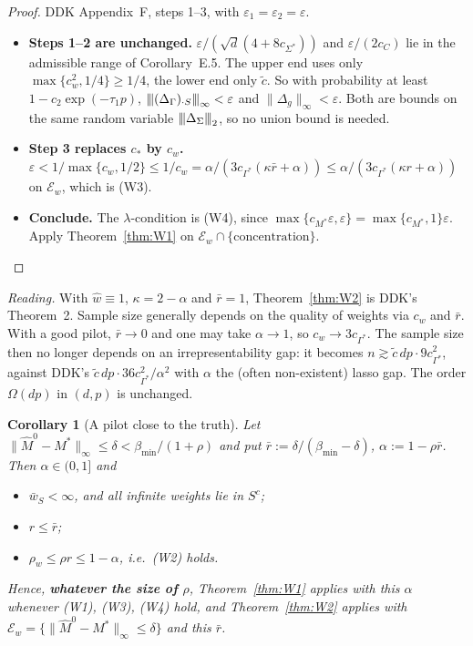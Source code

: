 \documentclass[11pt,a4paper]{article}
\numberwithin{equation}{section}
\theoremstyle{plain}
\newtheorem{corollary}[theorem]{Corollary}
\theoremstyle{remark}
\newcommand{\opnorm}[1]{{\vert\kern-0.25ex\vert\kern-0.25ex\vert #1 \vert\kern-0.25ex\vert\kern-0.25ex\vert}}
\begin{document}
\begin{proof}
DDK Appendix~F, steps 1--3, with $\varepsilon_1=\varepsilon_2=\varepsilon$.
\begin{itemize}
  \item \textbf{Steps 1--2 are unchanged.} $\varepsilon/(\sqrt d(4+8c_{\Sigma^*}))$ and $\varepsilon/(2c_C)$ lie in the admissible range of Corollary~E.5. The upper end uses only $\max\{c_w^2,1/4\}\ge1/4$, the lower end only $\tilde c$. So with probability at least $1-c_2\exp(-\tau_1p)$, $\opnorm{(\Delta_\Gamma)_{\cdot S}}_\infty<\varepsilon$ and $\|\Delta_g\|_\infty<\varepsilon$. Both are bounds on the same random variable $\opnorm{\Delta_\Sigma}_2$, so no union bound is needed.
  \item \textbf{Step 3 replaces $c_*$ by $c_w$.} $\varepsilon<1/\max\{c_w,1/2\}\le1/c_w=\alpha/(3c_{\Gamma^*}(\kappa\bar r+\alpha))\le\alpha/(3c_{\Gamma^*}(\kappa r+\alpha))$ on $\mathcal E_w$, which is (W3).
  \item \textbf{Conclude.} The $\lambda$-condition is (W4), since $\max\{c_{M^*}\varepsilon,\varepsilon\}=\max\{c_{M^*},1\}\varepsilon$. Apply Theorem~\ref{thm:W1} on $\mathcal E_w\cap\{\text{concentration}\}$.\qedhere
\end{itemize}
\end{proof}

\emph{Reading.} With $\hat w\equiv1$, $\kappa=2-\alpha$ and $\bar r=1$, Theorem~\ref{thm:W2} is DDK's Theorem~2. Sample size generally depends on the quality of weights via $c_w$ and $\bar{r}$. With a good pilot, $\bar r\to0$ and one may take $\alpha\to1$, so $c_w\to3c_{\Gamma^*}$. The sample size then no longer depends on an irrepresentability gap: it becomes $n\gtrsim\tilde c\,dp\cdot9c_{\Gamma^*}^2$, against DDK's $\tilde c\,dp\cdot36c_{\Gamma^*}^2/\alpha^2$ with $\alpha$ the (often non-existent) lasso gap. The order $\Omega(dp)$ in $(d,p)$ is unchanged.
\begin{corollary}[A pilot close to the truth]\label{cor:W3}
Let $\|\hat M^0-M^*\|_\infty\le\delta<\beta_{\min}/(1+\rho)$ and put
$\bar r:=\delta/(\beta_{\min}-\delta)$, $\alpha:=1-\rho\bar r$. Then $\alpha\in(0,1]$ and
\begin{itemize}
  \item[(i)] $\bar w_S<\infty$, and all infinite weights lie in $S^c$;
  \item[(ii)] $r\le\bar r$;
  \item[(iii)] $\rho_w\le\rho r\le1-\alpha$, i.e.\ (W2) holds.
\end{itemize}
Hence, \textbf{whatever the size of $\rho$}, Theorem~\ref{thm:W1} applies with this $\alpha$
whenever (W1), (W3), (W4) hold, and Theorem~\ref{thm:W2} applies with
$\mathcal E_w=\{\|\hat M^0-M^*\|_\infty\le\delta\}$ and this $\bar r$.
\end{corollary}
\end{document}

